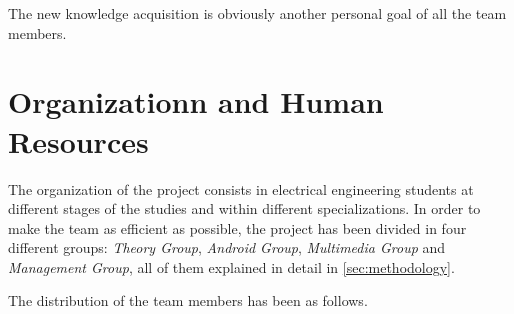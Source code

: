 \documentclass[11pt,a4paper,english]{book}  %
\theoremstyle{definition}  %
\theoremstyle{plain}  %
\theoremstyle{remark}  %
\begin{document}
	The new knowledge acquisition is obviously another personal goal of all the team members.
	
	
	\section{Organizationn and Human Resources}
	\label{organization}

The organization of the project consists in electrical engineering students at different stages of the studies and within different specializations. In order to make the team as efficient as possible, the project has been divided in four different groups: \textit{Theory Group}, \textit{Android Group}, \textit{Multimedia Group} and \textit{Management Group}, all of them explained in detail in \ref{sec:methodology}.

The distribution of the team members has been as follows.
\end{document}
